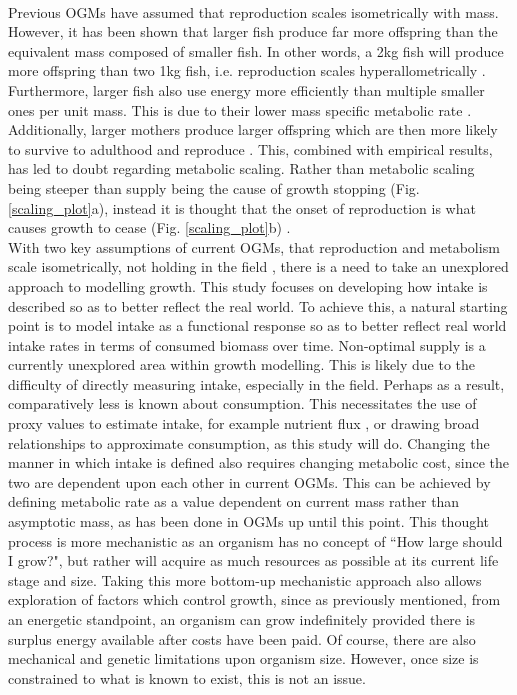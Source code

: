 \documentclass[a4paper, 11pt, hidelinks]{article} %
\begin{document}
	\\
	Previous OGMs have assumed that reproduction scales isometrically with mass.  
	However, it has been shown that larger fish produce far more offspring than the equivalent mass composed of smaller fish.  In other words, a 2kg fish will produce more offspring than two 1kg fish, i.e. reproduction scales hyperallometrically \parencite{Barneche2018}.
	Furthermore, larger fish also use energy more efficiently than multiple smaller ones per unit mass.  This is due to their lower mass specific metabolic rate \parencite{Peters1983, Kleiber1932, Brown2004}.  
	Additionally, larger mothers produce larger offspring which are then more likely to survive to adulthood and reproduce \parencite{Hixon2014, Marshall2006}. 
	This, combined with empirical results, has led to doubt regarding metabolic scaling.  Rather than metabolic scaling being steeper than supply being the cause of growth stopping (Fig. \ref{scaling_plot}a), instead it is thought that the onset of reproduction is what causes growth to cease (Fig. \ref{scaling_plot}b) \parencite{Marshall2019, Sibly2020}.
	\\
	With two key assumptions of current OGMs, that reproduction and metabolism scale isometrically, not holding in the field \parencite{Barneche2018, Pawar2012, Peters1983}, there is a need to take an unexplored approach to modelling growth.  This study focuses on developing how intake is described so as to better reflect the real world.  To achieve this, a natural starting point is to model intake as a functional response \parencite{Holling1959} so as to better reflect real world intake rates in terms of consumed biomass over time.  Non-optimal supply is a currently unexplored area within growth modelling.  This is likely due to the difficulty of directly measuring intake, especially in the field. Perhaps as a result, comparatively less is known about consumption.  This necessitates the use of proxy values to estimate intake, for example nutrient flux \parencite{Schiettekatte2020}, or drawing broad relationships to approximate consumption, as this study will do.
	Changing the manner in which intake is defined also requires changing metabolic cost, since the two are dependent upon each other in current OGMs.  This can be achieved by defining metabolic rate as a value dependent on current mass rather than asymptotic mass, as has been done in OGMs up until this point.  This thought process is more mechanistic as an organism has no concept of ``How large should I grow?", but rather will acquire as much resources as possible at its current life stage and size.  Taking this more bottom-up mechanistic approach also allows exploration of factors which control growth, since as previously mentioned, from an energetic standpoint, an organism can grow indefinitely provided there is surplus energy available after costs have been paid.  Of course, there are also mechanical and genetic limitations upon organism size. However, once size is constrained to what is known to exist, this is not an issue.  %
\end{document}
